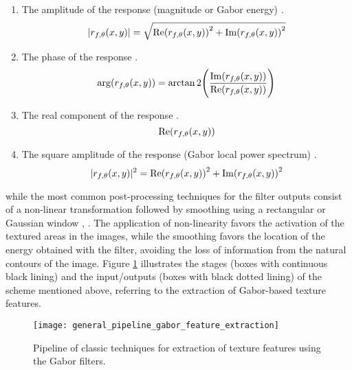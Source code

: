 \begin{enumerate}
    \item The amplitude of the response (magnitude or Gabor energy) \citep{Bovik.Clark.ea:TPAMI:1990}.
        \begin{equation}\label{eq:gabor_magnitude}
            |r_{f, \theta}(x,y)| = \sqrt{\mathrm{Re}{(r_{f, \theta}(x, y))}^2 + \mathrm{Im}{(r_{f, \theta}(x, y))}^2}
        \end{equation}
    \item The phase of the response \citep{Palm.Lehmann:MGV:2002}.
    \begin{equation}\label{eq:gabor_phase}
            \arg(r_{f, \theta}(x,y)) = \arctan2{\left(\frac{\mathrm{Im}{(r_{f, \theta}(x, y))}}{\mathrm{Re}{(r_{f, \theta}(x, y))}}\right)}
        \end{equation}
    \item The real component of the response \citep{Jain.Farrokhnia:IJPR:1991}.
    \begin{equation}\label{eq:gabor_real_part}
            \mathrm{Re}{(r_{f, \theta}(x, y))}
        \end{equation}
    \item The square amplitude of the response (Gabor local power spectrum) \citep{Grigorescu.Petkov.ea:TIP:2002}.
    \begin{equation}\label{eq:gabor_power}
            |r_{f, \theta}(x,y)|^2 = \mathrm{Re}{(r_{f, \theta}(x, y))}^2 + \mathrm{Im}{(r_{f, \theta}(x, y))}^2
        \end{equation}
\end{enumerate}
while the most common post-processing techniques for the filter outputs consist of a non-linear transformation followed by smoothing using a rectangular or Gaussian window \citep{Randen.Husoy:TPAMI:1999}, \citep{Clausi.EdJernigan:JPR:2000}. The application of non-linearity favors the activation of the textured areas in the images, while the smoothing favors the location of the energy obtained with the filter, avoiding the loss of information from the natural contours of the image. Figure \ref{fig:general_pipeline_gabor_feature_extraction} illustrates the stages (boxes with continuous black lining) and the input/outputs (boxes with black dotted lining) of the scheme mentioned above, referring to the extraction of Gabor-based texture features. 

\begin{figure}[!ht]
	\centering
	\texttt{[image: general\_pipeline\_gabor\_feature\_extraction]}
	\caption{Pipeline of classic techniques for extraction of texture features using the Gabor filters. }\label{fig:general_pipeline_gabor_feature_extraction}
\end{figure}


